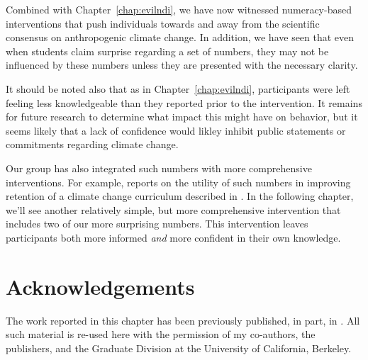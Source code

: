 Combined with Chapter~\ref{chap:evilndi}, we have now witnessed numeracy-based
interventions that push individuals towards and away from the scientific
consensus on anthropogenic climate change. In addition, we have seen that even
when students claim surprise regarding a set of numbers, they may not be
influenced by these numbers unless they are presented with the necessary clarity.

It should be noted also that as in Chapter~\ref{chap:evilndi}, participants were
left feeling less knowledgeable than they reported prior to the intervention. It
remains for future research to determine what impact this might have on
behavior, but it seems likely that a lack of confidence would likley
inhibit public statements or commitments regarding climate change.

Our group has also integrated such numbers with  more comprehensive
interventions. For example, \textcite{clark_knowledge_inpress} reports on the
utility of such numbers in improving retention of a climate change curriculum
described in \textcite{felipe_numerical_2012}. In the following chapter, we'll
see another relatively simple, but more comprehensive intervention that includes two
of our more surprising numbers. This intervention leaves participants both more informed
\emph{and} more confident in their own knowledge.

\section*{Acknowledgements}

The work reported in this chapter has been previously published, in part, in
\textcite{clark_knowledge_inpress}.  All such material is re-used here with the
permission of my co-authors, the publishers, and the Graduate Division at the
University of California, Berkeley.
